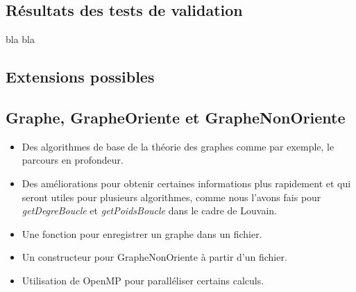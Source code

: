 \begin{titlepage}
{}


\newpage
\begin{center}
\begin{bf}
\section{Résultats des tests de validation}
\end{bf}
\end{center}

\vspace{1cm}
{
bla bla
}


\newpage
\begin{center}
\begin{bf}
\section{Extensions possibles}
\end{bf}
\end{center}

\vspace{1cm}
\subsection{Graphe, GrapheOriente et GrapheNonOriente}
{
\begin{itemize}
    \item Des algorithmes de base de la théorie des graphes comme par exemple, le parcours en profondeur.
    \item Des améliorations pour obtenir certaines informations plus rapidement et qui seront utiles pour plusieurs algorithmes, comme nous l'avons fais pour \textit{getDegreBoucle} et \textit{getPoidsBoucle} dans le cadre de Louvain.
    \item Une fonction pour enregistrer un graphe dans un fichier.
    \item Un constructeur pour GrapheNonOriente à partir d'un fichier.
    \item Utilisation de OpenMP pour paralléliser certains calculs.
\end{itemize}
}


\end{titlepage}
